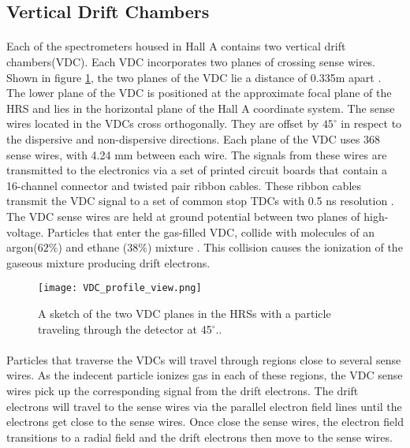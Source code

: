 	\subsection{Vertical Drift Chambers}\label{sec:vdc}
	\paragraph{}Each of the spectrometers housed in Hall A contains two vertical drift chambers(VDC). Each VDC incorporates two planes of crossing sense wires. Shown in figure \ref{VDC_profile}, the two planes of the VDC lie a distance of 0.335m apart \cite{drift}. The lower plane of the VDC is positioned at the approximate focal plane of the HRS and lies in the horizontal plane of the Hall A coordinate system. The sense wires located in the VDCs cross orthogonally. They are offset by $45^\circ$ in respect to the dispersive and non-dispersive directions. Each plane of the VDC uses 368 sense wires, with 4.24 mm between each wire. The signals from these wires are transmitted to the electronics via a set of printed circuit boards that contain a 16-channel connector and twisted pair ribbon cables. These ribbon cables transmit the VDC signal to a set of common stop TDCs with 0.5 ns resolution \cite{drift}. The VDC sense wires are held at ground potential between two planes of high-voltage. Particles that enter the gas-filled VDC, collide with molecules of an argon($62\%$) and ethane ($38\%$) mixture \cite{HallA}. This collision causes the ionization of the gaseous mixture producing drift electrons.
	\begin{figure}[t]
		\centering
		\texttt{[image: VDC\_profile\_view.png]}
		\caption{A sketch of the two VDC planes in the HRSs with a particle traveling through the detector at 45$^\circ$.\cite{drift}.
			\label{VDC_profile}}
	\end{figure}
	\paragraph{} Particles that traverse the VDCs will travel through regions close to several sense wires. As the indecent particle ionizes gas in each of these regions, the VDC sense wires pick up the corresponding signal from the drift electrons. The drift electrons will travel to the sense wires via the parallel electron field lines until the electrons get close to the sense wires. Once close the sense wires, the electron field transitions to a radial field and the drift electrons then move to the sense wires.

